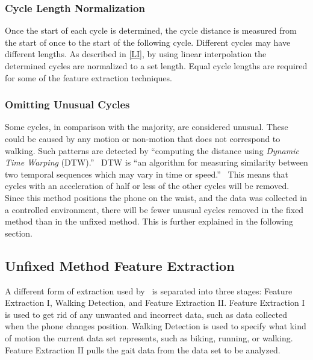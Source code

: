\documentclass{sig-alternate}
\begin{document}
			
\subsubsection{Cycle Length Normalization}
Once the start of each cycle is determined, the cycle distance is measured from the start of once to the start of the following cycle. Different cycles may have different lengths. As described in \ref{LI}, by using linear interpolation the determined cycles are normalized to a set length. Equal cycle lengths are required for some of the feature extraction techniques. 
			
\subsubsection{Omitting Unusual Cycles}
Some cycles, in comparison with the majority, are considered unusual. These could be caused by any motion or non-motion that does not correspond to walking. Such patterns are detected by ``computing the distance using \textit{Dynamic Time Warping} (DTW).''~\cite{Muaaz:2013} DTW is ``an algorithm for measuring similarity between two temporal sequences which may vary in time or speed.''~\cite{wiki2:2014} This means that cycles with an acceleration of half or less of the other cycles will be removed. Since this method positions the phone on the waist, and the data was collected in a controlled environment, there will be fewer unusual cycles removed in the fixed method than in the unfixed method. This is further explained in the following section.

\subsection{Unfixed Method Feature Extraction}
	A different form of extraction used by~\cite{Lu:2014} is separated into three stages: Feature Extraction I, Walking Detection, and Feature Extraction II. Feature Extraction I is used to get rid of any unwanted and incorrect data, such as data collected when the phone changes position. Walking Detection is used to specify what kind of motion the current data set represents, such as biking, running, or walking. Feature Extraction II pulls the gait data from the data set to be analyzed. 
\end{document}
